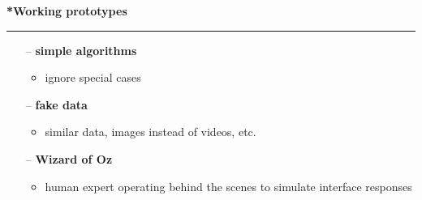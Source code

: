 \documentclass[pdf]{beamer}
\begin{document}
\begin{frame}
\vspace{8mm}
\textcolor{myBlue}{\textbf{\Large{*Working prototypes}}}

\textcolor{red}{\rule{10cm}{1mm}}

\begin{itemize}
\item[--] \textbf{simple algorithms }
\begin{itemize}
\item ignore special cases
\end{itemize}

\item[--] \textbf{fake data}
\begin{itemize}
\item similar data, images instead of videos, etc.
\end{itemize}

\item[--] \textbf{Wizard of Oz}
\begin{itemize}
\item human expert operating behind the scenes to simulate interface responses
\end{itemize}

\end{itemize}

\end{frame}
\end{document}
